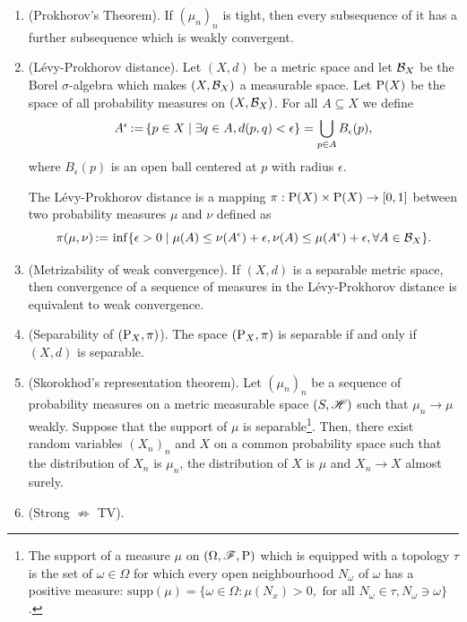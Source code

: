 \documentclass[a4paper,10pt]{article}
\begin{document}
\begin{enumerate}
 \item (Prokhorov's Theorem). If $(\mu_n)_n$ is tight, then every subsequence of it has a further subsequence
       which is weakly convergent. 
       
 \item (L\'{e}vy-Prokhorov distance). Let $(X,d)$ be a metric space and let $\mathcal{B}_X$ be the Borel $\sigma$-algebra
       which makes $(X, \mathcal{B}_X)$ a measurable space. Let $\mathrm{P}(X)$ be the space of all probability measures on 
       $(X, \mathcal{B}_X)$. For all $A\subseteq X$ we define
       \[
        A^\epsilon {}\mathop{\mathrel{:}=}{} \{p \in X {}\mid{} \exists q\in A, d(p,q)<\epsilon\} = \bigcup_{p\in A} B_\epsilon(p),
       \]
       where $B_\epsilon(p)$ is an open ball centered at $p$ with radius $\epsilon$. 
       
       The L\'{e}vy-Prokhorov distance is a mapping $\pi:\mathrm{P}(X)\times \mathrm{P}(X)\to [0,1]$
       between two probability measures $\mu$ and $\nu$ defined as
       \[
        \pi(\mu,\nu) {}\mathop{\mathrel{:}=}{}  \inf\{\epsilon>0 {}\mid{} \mu(A) \leq \nu(A^\epsilon)+\epsilon, \nu(A) \leq \mu(A^\epsilon)+\epsilon, \forall A\in \mathcal{B}_X\}.
       \]

 \item (Metrizability of weak convergence). If $(X, d)$ is a separable metric space, then convergence of a sequence of measures in the 
       L\'{e}vy-Prokhorov distance is equivalent to weak convergence.
       
 \item (Separability of $(\mathrm{P}_X, \pi)$). The space $(\mathrm{P}_X, \pi)$ is separable if and only if $(X,d)$ is separable.
       
 \item (Skorokhod's representation theorem). Let $(\mu_n)_n$ be a sequence of probability measures on a metric measurable space $(S,\mathscr{H})$
       such that $\mu_n\to \mu$ weakly. Suppose that the support of $\mu$ is separable\footnote{The support of a measure $\mu$
       on $(\Omega,\mathscr{F},\mathrm{P})$ which is equipped with a topology $\tau$ is the set of $\omega\in\Omega$ for which every open 
       neighbourhood $N_{\omega}$ of $\omega$ has a positive measure:
       $\mathrm{supp}(\mu)=\{\omega\in\Omega: \mu(N_x)>0, \text{ for all } N_\omega\in \tau, N_\omega\ni \omega\}$.}.
       Then, there exist random variables $(X_n)_n$ and $X$ on a common probability space such that the distribution 
       of $X_n$ is $\mu_n$, the distribution of $X$ is $\mu$ and $X_n\to X$ almost surely.
        
 \item (Strong $\nRightarrow$ TV).
\end{enumerate}
\end{document}
